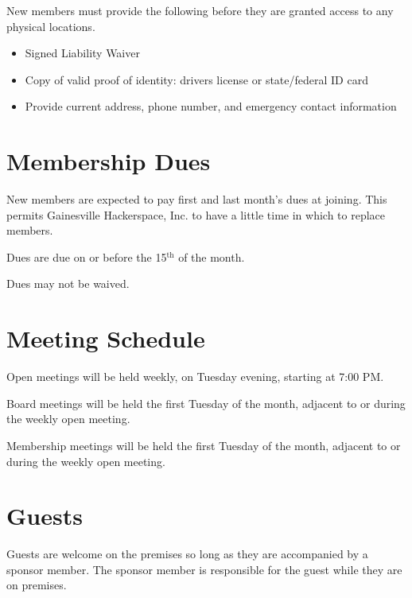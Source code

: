 \documentclass[10pt,letterpaper,titlepage]{article}
\newcommand\corpname{Gainesville Hackerspace, Inc.}
\newcommand{\superscript}[1]{\ensuremath{^{\textrm{#1}}}}
\renewcommand{\th}[0]{\superscript{th}}
\begin{document}
New members must provide the following before they are granted access to any 
physical locations.

\begin{itemize}
    \item Signed Liability Waiver
    \item Copy of valid proof of identity: drivers license or state/federal ID 
    card
    \item Provide current address, phone number, and emergency contact 
    information
\end{itemize}

\section{Membership Dues}
\label{dues}

New members are expected to pay first and last month's dues at joining. This
permits \corpname{} to have a little time in which to replace members.

Dues are due on or before the 15\th{} of the month.

Dues may not be waived.

\section{Meeting Schedule}

Open meetings will be held weekly, on Tuesday evening, starting at 7:00 PM.

Board meetings will be held the first Tuesday of the month, adjacent
to or during the weekly open meeting.

Membership meetings will be held the first Tuesday of the month,
adjacent to or during the weekly open meeting.

\section{Guests}
Guests are welcome on the premises so long as they are accompanied by a sponsor
member. The sponsor member is responsible for the guest while they are on
premises.
\end{document}

